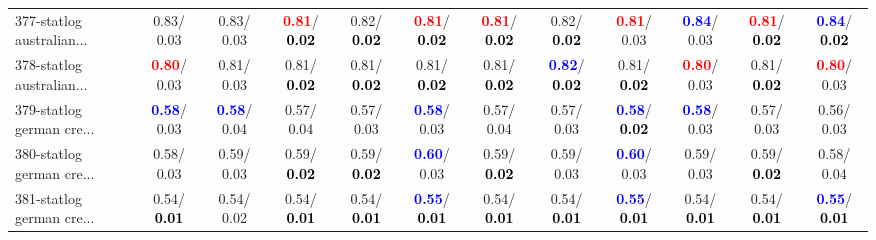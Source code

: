 \begin{table}[h]
\begin{center}
{\begin{tabular}{lc|c|c|c|c|c|c|c|c|c|c}
377-statlog australian... &   0.83/  0.03 &   0.83/  0.03 & \textcolor{red}{\textbf{  0.81}}/\textcolor{black}{\textbf{  0.02}} &   0.82/\textcolor{black}{\textbf{  0.02}} & \textcolor{red}{\textbf{  0.81}}/\textcolor{black}{\textbf{  0.02}} & \textcolor{red}{\textbf{  0.81}}/\textcolor{black}{\textbf{  0.02}} &   0.82/\textcolor{black}{\textbf{  0.02}} & \textcolor{red}{\textbf{  0.81}}/  0.03 & \textcolor{blue}{\textbf{  0.84}}/  0.03 & \textcolor{red}{\textbf{  0.81}}/\textcolor{black}{\textbf{  0.02}} & \textcolor{blue}{\textbf{  0.84}}/\textcolor{black}{\textbf{  0.02}} \\
378-statlog australian... & \textcolor{red}{\textbf{  0.80}}/  0.03 &   0.81/  0.03 &   0.81/\textcolor{black}{\textbf{  0.02}} &   0.81/\textcolor{black}{\textbf{  0.02}} &   0.81/\textcolor{black}{\textbf{  0.02}} &   0.81/\textcolor{black}{\textbf{  0.02}} & \textcolor{blue}{\textbf{  0.82}}/\textcolor{black}{\textbf{  0.02}} &   0.81/\textcolor{black}{\textbf{  0.02}} & \textcolor{red}{\textbf{  0.80}}/  0.03 &   0.81/\textcolor{black}{\textbf{  0.02}} & \textcolor{red}{\textbf{  0.80}}/  0.03 \\
379-statlog german cre... & \textcolor{blue}{\textbf{  0.58}}/  0.03 & \textcolor{blue}{\textbf{  0.58}}/  0.04 &   0.57/  0.04 &   0.57/  0.03 & \textcolor{blue}{\textbf{  0.58}}/  0.03 &   0.57/  0.04 &   0.57/  0.03 & \textcolor{blue}{\textbf{  0.58}}/\textcolor{black}{\textbf{  0.02}} & \textcolor{blue}{\textbf{  0.58}}/  0.03 &   0.57/  0.03 &   0.56/  0.03 \\
380-statlog german cre... &   0.58/  0.03 &   0.59/  0.03 &   0.59/\textcolor{black}{\textbf{  0.02}} &   0.59/\textcolor{black}{\textbf{  0.02}} & \textcolor{blue}{\textbf{  0.60}}/  0.03 &   0.59/\textcolor{black}{\textbf{  0.02}} &   0.59/  0.03 & \textcolor{blue}{\textbf{  0.60}}/  0.03 &   0.59/  0.03 &   0.59/\textcolor{black}{\textbf{  0.02}} &   0.58/  0.04 \\ \hline
381-statlog german cre... &   0.54/\textcolor{black}{\textbf{  0.01}} &   0.54/  0.02 &   0.54/\textcolor{black}{\textbf{  0.01}} &   0.54/\textcolor{black}{\textbf{  0.01}} & \textcolor{blue}{\textbf{  0.55}}/\textcolor{black}{\textbf{  0.01}} &   0.54/\textcolor{black}{\textbf{  0.01}} &   0.54/\textcolor{black}{\textbf{  0.01}} & \textcolor{blue}{\textbf{  0.55}}/\textcolor{black}{\textbf{  0.01}} &   0.54/\textcolor{black}{\textbf{  0.01}} &   0.54/\textcolor{black}{\textbf{  0.01}} & \textcolor{blue}{\textbf{  0.55}}/\textcolor{black}{\textbf{  0.01}} \\

\end{tabular}}
\end{center}
\end{table}
